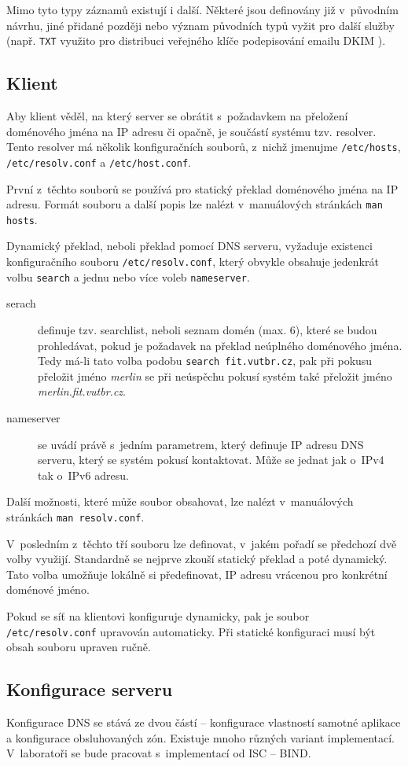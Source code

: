 Mimo tyto typy záznamů existují i další. Některé jsou definovány již v~původním návrhu, jiné přidané později nebo význam původních typů vyžit pro další služby (např. {\tt TXT} využito pro distribuci veřejného klíče podepisování emailu DKIM \cite{rfc4871}).

\subsection{Klient}
Aby klient věděl, na který server se obrátit s~požadavkem na přeložení doménového jména na IP adresu či opačně, je součástí systému tzv. resolver. Tento resolver má několik konfiguračních souborů, z~nichž jmenujme {\tt /etc/hosts}, {\tt /etc/resolv.conf} a {\tt /etc/host.conf}.

První z~těchto souborů se používá pro statický překlad doménového jména na IP adresu. Formát souboru a další popis lze nalézt v~manuálových stránkách {\tt man hosts}.

Dynamický překlad, neboli překlad pomocí DNS serveru, vyžaduje existenci konfiguračního souboru {\tt /etc/resolv.conf}, který obvykle obsahuje jedenkrát volbu {\tt search} a jednu nebo více voleb {\tt nameserver}.
\begin{description}
  \item[serach] definuje tzv. searchlist, neboli seznam domén (max. 6), které se budou prohledávat, pokud je požadavek na překlad neúplného doménového jména. Tedy má-li tato volba podobu {\tt search fit.vutbr.cz}, pak při pokusu přeložit jméno {\em merlin} se při neúspěchu pokusí systém také přeložit jméno {\em merlin.fit.vutbr.cz}.
  \item[nameserver] se uvádí právě s~jedním parametrem, který definuje IP adresu DNS serveru, který se systém pokusí kontaktovat. Může se jednat jak o~IPv4 tak o~IPv6 adresu.
\end{description}
Další možnosti, které může soubor obsahovat, lze nalézt v~manuálových stránkách {\tt man resolv.conf}.

V~posledním z~těchto tří souboru lze definovat, v~jakém pořadí se předchozí dvě volby využijí. Standardně se nejprve zkouší statický překlad a poté dynamický. Tato volba umožňuje lokálně si předefinovat, IP adresu vrácenou pro konkrétní doménové jméno.

Pokud se síť na klientovi konfiguruje dynamicky, pak je soubor {\tt /etc/resolv.conf} upravován automaticky. Při statické konfiguraci musí být obsah souboru upraven ručně.

\subsection{Konfigurace serveru}
Konfigurace DNS se stává ze dvou částí -- konfigurace vlastností samotné aplikace a konfigurace obsluhovaných zón. Existuje mnoho různých variant implementací. V~laboratoři se bude pracovat s~implementací od ISC -- BIND.

